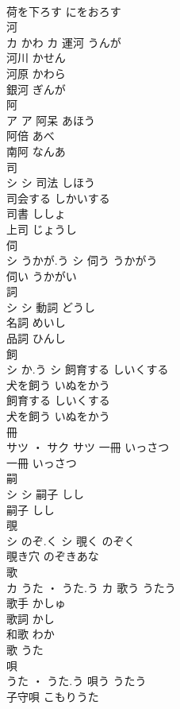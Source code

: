 \documentclass[8pt]{extreport}
\begin{document}
\begin{CJK}{UTF8}{min}
\\	荷を下ろす	にをおろす	
\\	河	
\\	カ	かわ	カ	運河	うんが	
\\	河川	かせん	
\\	河原	かわら	
\\	銀河	ぎんが	
\\	阿	
\\	ア		ア													阿呆	あほう	
\\	阿倍	あべ	
\\	南阿	なんあ	
\\	司	
\\	シ		シ	司法	しほう	
\\	司会する	しかいする	
\\	司書	ししょ	
\\	上司	じょうし	
\\	伺	
\\	シ	うかが.う	シ	伺う	うかがう	
\\	伺い	うかがい	
\\	詞	
\\	シ		シ	動詞	どうし	
\\	名詞	めいし	
\\	品詞	ひんし	
\\	飼	
\\	シ	か.う	シ	飼育する	しいくする	
\\	犬を飼う	いぬをかう	
\\	飼育する	しいくする	
\\	犬を飼う	いぬをかう	
\\	冊	
\\	サツ ・ サク		サツ	一冊	いっさつ	
\\	一冊	いっさつ	
\\	嗣	
\\	シ		シ	嗣子	しし	
\\	嗣子	しし	
\\	覗	
\\	シ	のぞ.く	シ	覗く	のぞく	
\\	覗き穴	のぞきあな	
\\	歌	
\\	カ	うた ・ うた.う	カ	歌う	うたう	
\\	歌手	かしゅ	
\\	歌詞	かし	
\\	和歌	わか	
\\	歌	うた	
\\	唄	
\\	うた ・ うた.う		唄う	うたう	
\\	子守唄	こもりうた	

\end{CJK}
\end{document}
